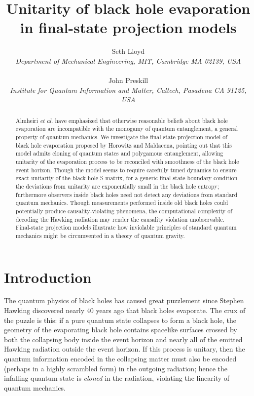 \documentclass[11pt]{article}
\begin{document}
\title{\bf Unitarity of black hole evaporation in final-state
projection models}
\author{Seth Lloyd\\
{\em \small Department of Mechanical Engineering, MIT, Cambridge MA 02139, USA}\\ \\
John Preskill\\
{\em \small Institute for Quantum Information and Matter, Caltech, Pasadena CA 91125, USA}}
\date{}
\maketitle

\begin{abstract}
Almheiri {\em et al.} have emphasized that otherwise reasonable beliefs about black hole evaporation are incompatible with the monogamy of quantum entanglement, a general property of quantum mechanics. We investigate the final-state projection model of black hole evaporation proposed by Horowitz and Maldacena, pointing out that this model admits cloning of quantum states and polygamous entanglement, allowing unitarity of the evaporation process to be reconciled with smoothness of the black hole event horizon. Though the model seems to require carefully tuned dynamics to ensure exact unitarity of the black hole S-matrix, for a generic final-state boundary condition the deviations from unitarity are exponentially small in the black hole entropy; furthermore observers inside black holes need not detect any deviations from standard quantum mechanics.  Though measurements performed inside old black holes could potentially produce causality-violating phenomena, the computational complexity of decoding the Hawking radiation may render the causality violation unobservable. Final-state projection models illustrate how inviolable principles of standard quantum mechanics might be circumvented in a theory of quantum gravity.
\end{abstract}

\newpage

\section{Introduction}

The quantum physics of black holes has caused great puzzlement since Stephen Hawking discovered \cite{hawking1} nearly 40 years ago that black holes evaporate. The crux of the puzzle is this: if a pure quantum state collapses to form a black hole, the geometry of the evaporating black hole contains spacelike surfaces crossed by both the collapsing body inside the event horizon and nearly all of the emitted Hawking radiation outside the event horizon. If this process is unitary, then the quantum information encoded in the collapsing matter must also be encoded (perhaps in a highly scrambled form) in the outgoing radiation; hence the infalling quantum state is {\em cloned} in the radiation, violating the linearity of quantum mechanics.
\end{document}
